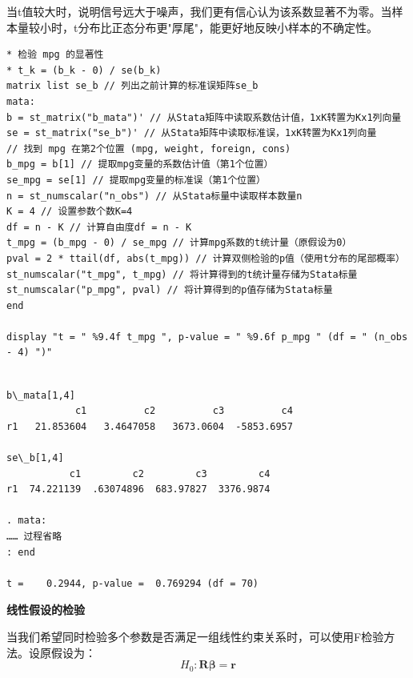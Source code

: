 当t值较大时，说明信号远大于噪声，我们更有信心认为该系数显著不为零。当样本量较小时，t分布比正态分布更"厚尾"，能更好地反映小样本的不确定性。

\begin{tcolorbox}[title=在 Stata 的 Mata 中进行单个系数 t 检验, colback=white, colframe=black, colbacktitle=white, coltitle=black,fonttitle=\bfseries]
	\begin{lstlisting}[xleftmargin=2em, commentstyle=\color{black}]
* 检验 mpg 的显著性
* t_k = (b_k - 0) / se(b_k)
matrix list se_b // 列出之前计算的标准误矩阵se_b
mata:
b = st_matrix("b_mata")' // 从Stata矩阵中读取系数估计值，1xK转置为Kx1列向量
se = st_matrix("se_b")' // 从Stata矩阵中读取标准误，1xK转置为Kx1列向量
// 找到 mpg 在第2个位置 (mpg, weight, foreign, cons)
b_mpg = b[1] // 提取mpg变量的系数估计值（第1个位置）
se_mpg = se[1] // 提取mpg变量的标准误（第1个位置）
n = st_numscalar("n_obs") // 从Stata标量中读取样本数量n
K = 4 // 设置参数个数K=4
df = n - K // 计算自由度df = n - K
t_mpg = (b_mpg - 0) / se_mpg // 计算mpg系数的t统计量（原假设为0）
pval = 2 * ttail(df, abs(t_mpg)) // 计算双侧检验的p值（使用t分布的尾部概率）
st_numscalar("t_mpg", t_mpg) // 将计算得到的t统计量存储为Stata标量
st_numscalar("p_mpg", pval) // 将计算得到的p值存储为Stata标量
end

display "t = " %9.4f t_mpg ", p-value = " %9.6f p_mpg " (df = " (n_obs - 4) ")"
	\end{lstlisting}
	\vspace{-2em}
	\begin{Verbatim}[commandchars=\\\{\},xleftmargin=2em]

b\_mata[1,4]
            c1          c2          c3          c4
r1   21.853604   3.4647058   3673.0604  -5853.6957

se\_b[1,4]
           c1         c2         c3         c4
r1  74.221139  .63074896  683.97827  3376.9874

. mata:
…… 过程省略
: end

t =    0.2944, p-value =  0.769294 (df = 70)
	\end{Verbatim}

\end{tcolorbox}

\textbf{线性假设的检验}

当我们希望同时检验多个参数是否满足一组线性约束关系时，可以使用F检验方法。设原假设为：
\begin{equation}
H_0: \mathbf{R}\boldsymbol{\beta} = \mathbf{r}
\end{equation}

